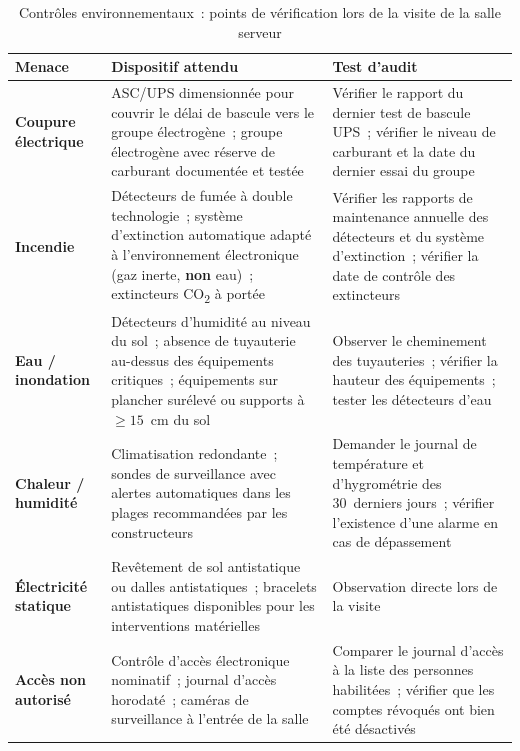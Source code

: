 \begin{table}[H]
\centering
\small
\renewcommand{\arraystretch}{1.5}
\caption{Contrôles environnementaux~: points de vérification lors de la visite
de la salle serveur}
\label{tab:controles-env}
\begin{tabular}{|p{2.8cm}|p{4.8cm}|p{4.5cm}|}
    \hline
    \rowcolor{gray!20}
    \textbf{Menace} & \textbf{Dispositif attendu} &
    \textbf{Test d'audit} \\ \hline
    \textbf{Coupure électrique} &
    ASC/UPS dimensionnée pour couvrir le délai de bascule vers le groupe
    électrogène~; groupe électrogène avec réserve de carburant documentée
    et testée &
    Vérifier le rapport du dernier test de bascule UPS~; vérifier le niveau
    de carburant et la date du dernier essai du groupe \\ \hline
    \textbf{Incendie} &
    Détecteurs de fumée à double technologie~; système d'extinction
    automatique adapté à l'environnement électronique (gaz inerte,
    \textbf{non} eau)~; extincteurs CO\textsubscript{2} à portée &
    Vérifier les rapports de maintenance annuelle des détecteurs et du
    système d'extinction~; vérifier la date de contrôle des extincteurs
    \\ \hline
    \textbf{Eau / inondation} &
    Détecteurs d'humidité au niveau du sol~; absence de tuyauterie
    au-dessus des équipements critiques~; équipements sur plancher surélevé
    ou supports à $\geq 15$~cm du sol &
    Observer le cheminement des tuyauteries~; vérifier la hauteur des
    équipements~; tester les détecteurs d'eau \\ \hline
    \textbf{Chaleur / humidité} &
    Climatisation redondante~; sondes de surveillance avec alertes
    automatiques dans les plages recommandées par les constructeurs &
    Demander le journal de température et d'hygrométrie des 30~derniers
    jours~; vérifier l'existence d'une alarme en cas de dépassement \\ \hline
    \textbf{Électricité statique} &
    Revêtement de sol antistatique ou dalles antistatiques~; bracelets
    antistatiques disponibles pour les interventions matérielles &
    Observation directe lors de la visite \\ \hline
    \textbf{Accès non autorisé} &
    Contrôle d'accès électronique nominatif~; journal d'accès horodaté~;
    caméras de surveillance à l'entrée de la salle &
    Comparer le journal d'accès à la liste des personnes habilitées~;
    vérifier que les comptes révoqués ont bien été désactivés \\ \hline
\end{tabular}
\end{table}

